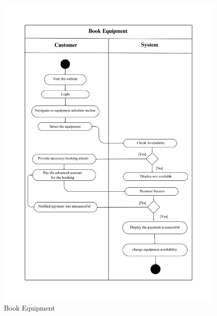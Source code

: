 \begin{figure}[h!]
    \centering
    \includegraphics[width=1\textwidth]{Images/Activity Diagrams/23 Book Equipment.png}
    \caption{Book Equipment}
    \label{fig:activity-book-equ}
\end{figure}

